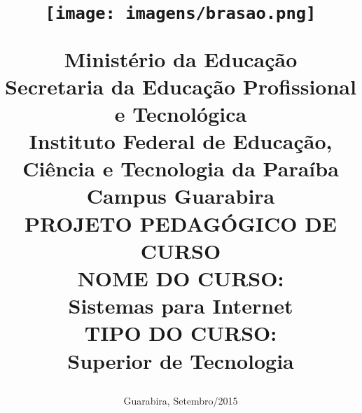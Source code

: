 

\setcounter{secnumdepth}{4}
\setcounter{tocdepth}{4}



\title{  \vspace{-0.8in} 
\begin{figure}[!htb]
\centering
\texttt{[image: imagens/brasao.png]}
\end{figure}
 \Large  Minist\'erio da Educa\c{c}\~ao  \\
 Secretaria da Educa\c{c}\~ao Profissional e Tecnol\'ogica   \\
Instituto Federal de Educa\c{c}\~ao, Ci\^encia e Tecnologia da Para\'iba \\
Campus Guarabira\\
\vspace{3cm}
\bf \large PROJETO PEDAG\'OGICO DE CURSO\\
\vspace{2cm}
\normalsize NOME DO CURSO:\\
\large Sistemas para Internet\\
\vspace{2cm}
\normalsize TIPO DO CURSO:\\
\large Superior de Tecnologia}


 \vspace{2cm}
\large
\date{\vspace{3.6cm}Guarabira, Setembro/2015}
\maketitle
\normalsize
\thispagestyle{empty}

\newpage

